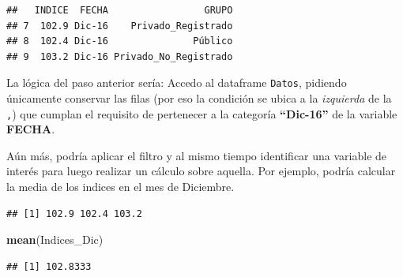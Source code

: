 \documentclass[]{book}
\newenvironment{Shaded}{\begin{snugshade}}{\end{snugshade}}
\newcommand{\CommentTok}[1]{\textcolor[rgb]{0.56,0.35,0.01}{\textit{#1}}}
\newcommand{\KeywordTok}[1]{\textcolor[rgb]{0.13,0.29,0.53}{\textbf{#1}}}
\newcommand{\NormalTok}[1]{#1}
\newcommand{\OperatorTok}[1]{\textcolor[rgb]{0.81,0.36,0.00}{\textbf{#1}}}
\newcommand{\StringTok}[1]{\textcolor[rgb]{0.31,0.60,0.02}{#1}}
\begin{document}
\begin{Shaded}
\end{Shaded}

\begin{verbatim}
##   INDICE  FECHA                 GRUPO
## 7  102.9 Dic-16    Privado_Registrado
## 8  102.4 Dic-16               Público
## 9  103.2 Dic-16 Privado_No_Registrado
\end{verbatim}

La lógica del paso anterior sería: Accedo al dataframe \texttt{Datos}, pidiendo únicamente conservar las filas (por eso la condición se ubica a la \emph{izquierda} de la \texttt{,}) que cumplan el requisito de pertenecer a la categoría \textbf{``Dic-16''} de la variable \textbf{FECHA}.

Aún más, podría aplicar el filtro y al mismo tiempo identificar una variable de interés para luego realizar un cálculo sobre aquella. Por ejemplo, podría calcular la media de los indices en el mes de Diciembre.

\begin{Shaded}
\end{Shaded}

\begin{verbatim}
## [1] 102.9 102.4 103.2
\end{verbatim}

\begin{Shaded}
\begin{Highlighting}[]
\KeywordTok{mean}\NormalTok{(Indices_Dic)}
\end{Highlighting}
\end{Shaded}

\begin{verbatim}
## [1] 102.8333
\end{verbatim}

\begin{Shaded}
\end{Shaded}
\end{document}

